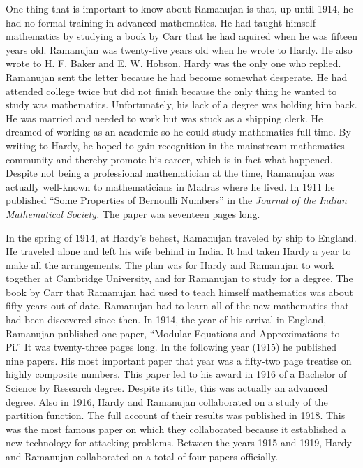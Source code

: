 One thing that is important to know about Ramanujan is that, up until 1914, he
had no formal training in advanced mathematics.
He had taught himself mathematics by studying a book by Carr
that he had aquired when he was fifteen years old.
Ramanujan was twenty-five years old when he wrote to Hardy.
He also wrote to H. F. Baker and E. W. Hobson.
Hardy was the only one who replied.
Ramanujan sent the letter because he had become somewhat desperate.
He had attended college twice but did not finish because
the only thing he wanted to study was mathematics.
Unfortunately, his lack of a degree was holding him back.
He was married and needed to work but was stuck as a shipping clerk.
He dreamed of working as an academic so he could study
mathematics full time.
By writing to Hardy, he hoped to gain recognition in the mainstream mathematics
community and thereby promote his career,
which is in fact what happened.
Despite not being a professional mathematician at the time,
Ramanujan was actually well-known to mathematicians
in Madras where he lived.
In 1911 he published ``Some Properties of Bernoulli Numbers'' in the
{\it Journal of the Indian Mathematical Society.}
The paper was seventeen pages long.

In the spring of 1914, at Hardy's behest, Ramanujan traveled by ship to England.
He traveled alone and left his wife behind in India.
It had taken Hardy a year to make all the arrangements.
The plan was for Hardy and Ramanujan to work together at Cambridge University,
and for Ramanujan to study for a degree.
The book by Carr that Ramanujan had used to teach himself
mathematics was about fifty years out of date.
Ramanujan had to learn all of the new mathematics that had
been discovered since then.
In 1914, the year of his arrival in England, Ramanujan published one
paper, ``Modular Equations and Approximations to Pi.''
It was twenty-three pages long.
In the following year (1915) he published nine papers.
His most important paper that year was a fifty-two page treatise on highly composite numbers.
This paper led to his award in 1916 of a Bachelor of Science by Research degree.
Despite its title, this was actually an advanced degree.
Also in 1916, Hardy and Ramanujan collaborated on a study of the partition function.
The full account of their results was published in 1918.
This was the most famous paper on which they collaborated because it
established a new technology for attacking problems.
Between the years 1915 and 1919, Hardy and Ramanujan collaborated
on a total of four papers officially.

